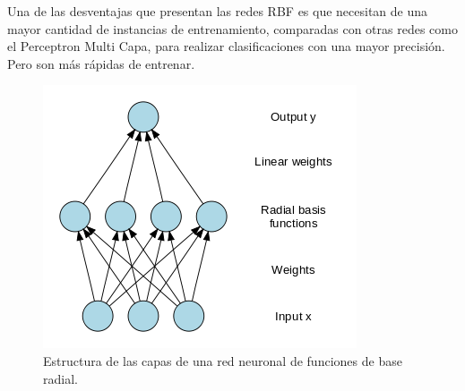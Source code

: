 Una de las desventajas que presentan las redes RBF es que necesitan de una mayor cantidad de instancias de entrenamiento, comparadas con otras redes como el Perceptron Multi Capa, para realizar clasificaciones con una mayor precisión. Pero son más rápidas de entrenar\cite{key-50, key-200}.
\begin{figure}[H]
\begin{centering}
\includegraphics[scale=0.6]{rbf}
\par\end{centering}
\caption{Estructura de las capas de una red neuronal de funciones de base radial.}
\end{figure}